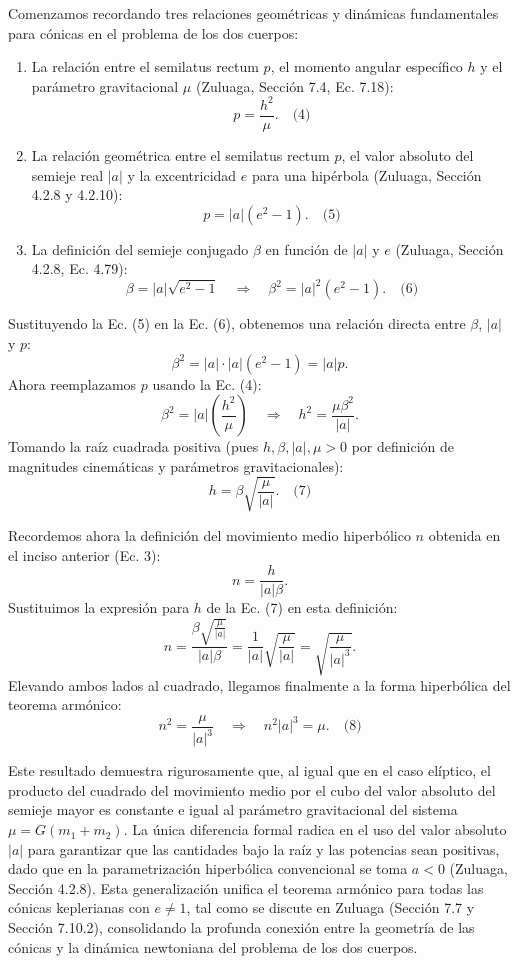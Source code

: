 \documentclass[12pt, a4paper]{article}
\begin{document}
Comenzamos recordando tres relaciones geométricas y dinámicas fundamentales para cónicas en el problema de los dos cuerpos:
\begin{enumerate}
    \item La relación entre el semilatus rectum $p$, el momento angular específico $h$ y el parámetro gravitacional $\mu$ (Zuluaga, Sección 7.4, Ec. 7.18):
    $$
    p = \frac{h^2}{\mu}. \quad \text{(4)}
    $$
    \item La relación geométrica entre el semilatus rectum $p$, el valor absoluto del semieje real $|a|$ y la excentricidad $e$ para una hipérbola (Zuluaga, Sección 4.2.8 y 4.2.10):
    $$
    p = |a| (e^2 - 1). \quad \text{(5)}
    $$
    \item La definición del semieje conjugado $\beta$ en función de $|a|$ y $e$ (Zuluaga, Sección 4.2.8, Ec. 4.79):
    $$
    \beta = |a| \sqrt{e^2 - 1} \quad \Longrightarrow \quad \beta^2 = |a|^2 (e^2 - 1). \quad \text{(6)}
    $$
\end{enumerate}

Sustituyendo la Ec. (5) en la Ec. (6), obtenemos una relación directa entre $\beta$, $|a|$ y $p$:
$$
\beta^2 = |a| \cdot |a| (e^2 - 1) = |a| p.
$$
Ahora reemplazamos $p$ usando la Ec. (4):
$$
\beta^2 = |a| \left( \frac{h^2}{\mu} \right) \quad \Longrightarrow \quad h^2 = \frac{\mu \beta^2}{|a|}.
$$
Tomando la raíz cuadrada positiva (pues $h, \beta, |a|, \mu > 0$ por definición de magnitudes cinemáticas y parámetros gravitacionales):
$$
h = \beta \sqrt{\frac{\mu}{|a|}}. \quad \text{(7)}
$$

Recordemos ahora la definición del movimiento medio hiperbólico $n$ obtenida en el inciso anterior (Ec. 3):
$$
n = \frac{h}{|a| \beta}.
$$
Sustituimos la expresión para $h$ de la Ec. (7) en esta definición:
$$
n = \frac{\beta \sqrt{\frac{\mu}{|a|}}}{|a| \beta} = \frac{1}{|a|} \sqrt{\frac{\mu}{|a|}} = \sqrt{\frac{\mu}{|a|^3}}.
$$
Elevando ambos lados al cuadrado, llegamos finalmente a la forma hiperbólica del teorema armónico:
$$
n^2 = \frac{\mu}{|a|^3} \quad \Longrightarrow \quad n^2 |a|^3 = \mu. \quad \text{(8)}
$$

Este resultado demuestra rigurosamente que, al igual que en el caso elíptico, el producto del cuadrado del movimiento medio por el cubo del valor absoluto del semieje mayor es constante e igual al parámetro gravitacional del sistema $\mu = G(m_1 + m_2)$. La única diferencia formal radica en el uso del valor absoluto $|a|$ para garantizar que las cantidades bajo la raíz y las potencias sean positivas, dado que en la parametrización hiperbólica convencional se toma $a < 0$ (Zuluaga, Sección 4.2.8). Esta generalización unifica el teorema armónico para todas las cónicas keplerianas con $e \neq 1$, tal como se discute en Zuluaga (Sección 7.7 y Sección 7.10.2), consolidando la profunda conexión entre la geometría de las cónicas y la dinámica newtoniana del problema de los dos cuerpos.
\end{document}
